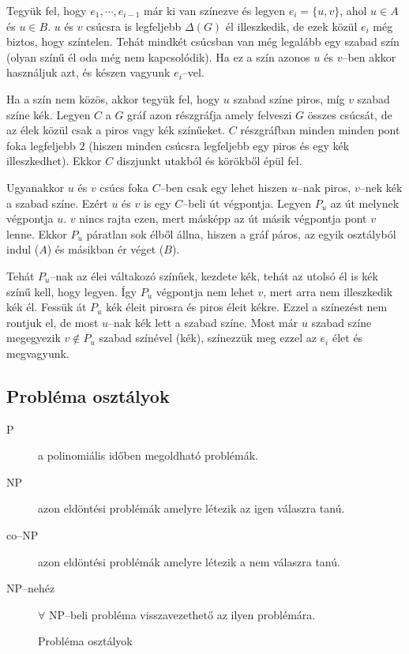 Tegyük fel, hogy $e_1, \cdots, e_{i-1}$ már ki van színezve és legyen
$e_i=\{u,v\}$, ahol $u \in A$ és $u \in B$. $u$ és $v$ csúcsra is legfeljebb
$\Delta(G)$ él illeszkedik, de ezek közül $e_i$ még biztos, hogy színtelen.
Tehát mindkét csúcsban van még legalább egy szabad szín (olyan színű él oda még
nem kapcsolódik). Ha ez a szín azonos $u$ és $v$--ben akkor használjuk azt, és
készen vagyunk $e_i$--vel.

Ha a szín nem közös, akkor tegyük fel, hogy $u$ szabad színe piros, míg $v$
szabad színe kék. Legyen $C$ a $G$ gráf azon részgráfja amely felveszi $G$
összes csúcsát, de az élek közül csak a piros vagy kék színűeket. $C$
részgráfban minden minden pont foka legfeljebb $2$ (hiszen minden csúcsra
legfeljebb egy piros és egy kék illeszkedhet). Ekkor $C$ diszjunkt utakból és
körökből épül fel.

Ugyanakkor $u$ és $v$ csúcs foka $C$--ben csak egy lehet hiszen $u$--nak piros,
$v$--nek kék a szabad színe. Ezért $u$ és $v$ is egy $C$--beli út végpontja.
Legyen $P_u$ az út melynek végpontja $u$. $v$ nincs rajta ezen, mert másképp az
út másik végpontja pont $v$ lenne. Ekkor $P_u$ páratlan sok élből állna, hiszen 
a gráf páros, az egyik osztályból indul ($A$) és másikban ér véget ($B$). 

Tehát $P_u$--nak az élei váltakozó színűek, kezdete kék, tehát az utolsó él is
kék színű kell, hogy legyen. Így $P_u$ végpontja nem lehet $v$, mert arra nem
illeszkedik kék él. Fessük át $P_u$ kék éleit pirosra és piros éleit kékre.
Ezzel a színezést nem rontjuk el, de most $u$--nak kék lett a szabad színe. Most
már $u$ szabad színe megegyezik $v \not \in P_u$ szabad színével (kék),
színezzük meg ezzel az $e_i$ élet és megvagyunk.

\subsection{Probléma osztályok}
\begin{description}
  \item[P] a polinomiális időben megoldható problémák.
  \item[NP] azon eldöntési problémák amelyre létezik az igen válaszra tanú.
  \item[co--NP] azon eldöntési problémák amelyre létezik a nem válaszra tanú.
  \item[NP--nehéz] $\forall$ NP--beli probléma visszavezethető az ilyen problémára.
\end{description}

\begin{figure}[htbp]
\caption{Probléma osztályok}
\label{fig:ProbOszt}
\centering
{}  
\end{figure}

